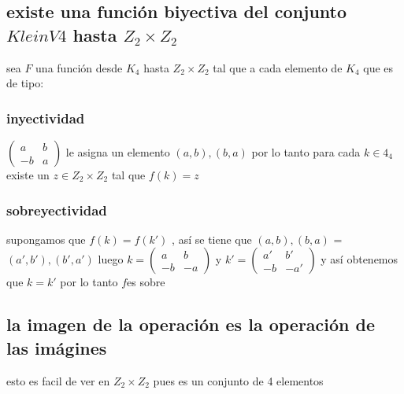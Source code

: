 \documentclass[10pt,a4paper]{article} %
\begin{document}
            \subsection{existe una función biyectiva del conjunto $KleinV4$
            hasta $ Z_2 \times Z_2$}
                sea $F$ una función desde $K_4$ hasta $Z_2 \times Z_2$ tal que a cada elemento de $K_4$ que es de tipo:
                \subsubsection{inyectividad}
                    $\begin{pmatrix}
                      a & b
                      \\
                      -b & a
                    \end{pmatrix}$
                    le asigna un elemento $(a,b) , (b,a)$
                    por lo tanto para cada $k \in 4_4$ existe un $z \in Z_2
                    \times Z_2$ tal que $f(k) = z$
                \subsubsection{sobreyectividad}
                supongamos que $f(k) = f(k')$ , así se tiene que $(a,b) , (b,a)$ = $(a',b') , (b',a')$ luego $ k = \begin{pmatrix}
                    a & b
                    \\
                    -b & -a
                \end{pmatrix}
                $ y $k ' = \begin{pmatrix}
                    a' & b'
                    \\
                    -b & -a'
                \end{pmatrix}
                $ y así obtenemos que $k = k'$
                por lo tanto $f$es sobre
                \subsection{la imagen de la operación es la operación de las imágines}
                esto es facil de ver en $Z_2 \times Z_2$ pues es un conjunto de 4 elementos
\end{document}
